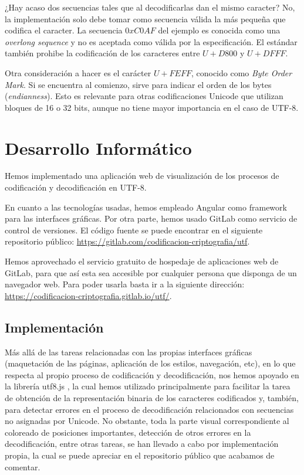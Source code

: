\documentclass{article}
\begin{document}
¿Hay acaso dos secuencias tales que al decodificarlas dan el mismo caracter? No,
la implementación solo debe tomar como secuencia válida la más pequeña que
codifica el caracter. La secuencia $0xC0AF$ del ejemplo es conocida como una
\textit{overlong sequence} y no es aceptada como válida por la especificación.
El estándar también prohibe la codificación de los caracteres entre $U+D800$ y
$U+DFFF$.

Otra consideración a hacer es el carácter $U+FEFF$, conocido como \textit{Byte
  Order Mark}. Si se encuentra al comienzo, sirve para indicar el orden de los
bytes (\textit{endianness}). Esto es relevante para otras codificaciones Unicode
que utilizan bloques de 16 o 32 bits, aunque no tiene mayor importancia en el
caso de UTF-8.

\section{Desarrollo Informático}
Hemos implementado una aplicación web de visualización de los procesos de
codificación y decodificación en UTF-8.

En cuanto a las tecnologías usadas, hemos empleado Angular como framework para
las interfaces gráficas. Por otra parte, hemos usado GitLab como servicio de
control de versiones. El código fuente se puede encontrar en el siguiente
repositorio público:
\href{https://gitlab.com/codificacion-criptografia/utf}{https://gitlab.com/codificacion-criptografia/utf}.

Hemos aprovechado el servicio gratuito de hospedaje de aplicaciones web de
GitLab, para que así esta sea accesible por cualquier persona que disponga de un
navegador web. Para poder usarla basta ir a la siguiente dirección:
\href{https://codificacion-criptografia.gitlab.io/utf/}{https://codificacion-criptografia.gitlab.io/utf/}.

\subsection{Implementación}
Más allá de las tareas relacionadas con las propias interfaces gráficas
(maquetación de las páginas, aplicación de los estilos, navegación, etc), en lo
que respecta al propio proceso de codificación y decodificación, nos hemos
apoyado en la librería utf8.js \cite{utf8-npm}, la cual hemos utilizado
principalmente para facilitar la tarea de obtención de la representación binaria
de los caracteres codificados y, también, para detectar errores en el proceso de
decodificación relacionados con secuencias no asignadas por Unicode. No
obstante, toda la parte visual correspondiente al coloreado de posiciones
importantes, detección de otros errores en la decodificación, entre otras
tareas, se han llevado a cabo por implementación propia, la cual se puede
apreciar en el repositorio público que acabamos de comentar.
\end{document}
